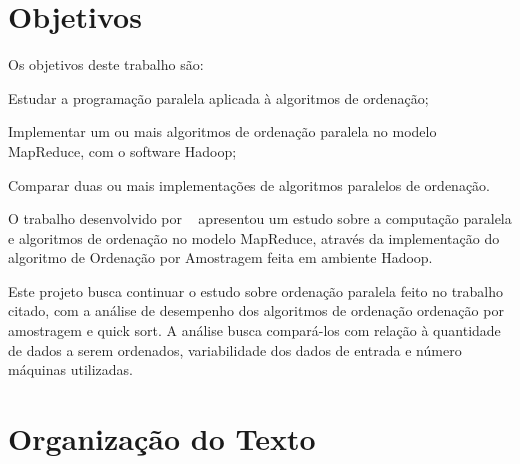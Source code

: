 
\section{Objetivos}

Os objetivos deste trabalho são:

\begin{packed_enum}
\item Estudar a programação paralela aplicada à algoritmos de ordenação;
\item Implementar um ou mais algoritmos de ordenação paralela no modelo MapReduce, com o software Hadoop;
\item Comparar duas ou mais implementações de algoritmos paralelos de ordenação.
\end{packed_enum}

O trabalho desenvolvido por ~\cite{Paula:2011} apresentou um estudo sobre a computação paralela e algoritmos de ordenação no modelo MapReduce, através da implementação do algoritmo de Ordenação por Amostragem feita em ambiente Hadoop. 

Este projeto busca continuar o estudo sobre ordenação paralela feito no trabalho citado, com a análise de desempenho dos algoritmos de ordenação ordenação por amostragem e quick sort. A análise busca compará-los com relação à quantidade de dados a serem ordenados, variabilidade dos dados de entrada e número máquinas utilizadas. 


\section{Organização do Texto}

